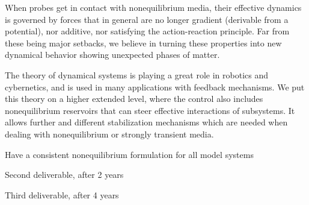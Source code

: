 \begin{workpackage}[id=WPcore,wphases=0-48,
  short=Gen. Theory, %
  title=General Theory, %
  lead=KUL,
  KULRM=36,UNIPDRM=6]
\begin{wpdescription}
\printbibliography[heading=proposal-bib,env=proposal-env]

\end{wpdescription}

\begin{tasklist}

\begin{task}[title=Theory of statistical forces outside equilibrium,id=core-t1,lead=KUL,partners={UNIPD},wphases={0-24!0.5,12-30}]
When probes get in contact with nonequilibrium media, their effective dynamics is governed
by forces that in general are no longer gradient (derivable from a potential), nor additive,
nor satisfying the action-reaction principle. Far from these being major setbacks, we
believe in turning these properties into new dynamical behavior showing unexpected phases of
matter.
\end{task}

\begin{task}[title=Stability and control theory,id=core-t2,PM=12,lead=KUL,wphases=12-36!0.5]
The theory of dynamical systems is playing a great role in robotics and cybernetics, and is
used in many applications with feedback mechanisms. We put this theory on a higher extended
level, where the control also includes nonequilibrium reservoirs that can steer effective
interactions of subsystems.
%
It allows further and different stabilization mechanisms which are needed when dealing with
nonequilibrium or strongly transient media.
\end{task}

\end{tasklist}

\begin{wpdelivs}
  \begin{wpdeliv}[due=24,id=core-d1,dissem=PU,nature=DEM,lead=KUL,miles=framework]
      {Have a consistent nonequilibrium formulation for all model systems}
  \end{wpdeliv}
  \begin{wpdeliv}[due=24,id=core-d2,dissem=PU,nature=DEM,lead=KUL]
      {Second deliverable, after 2 years}
\end{wpdeliv}
  \begin{wpdeliv}[due=48,id=core-d3,dissem=PU,nature=DEM,lead=KUL]
      {Third deliverable, after 4 years}
\end{wpdeliv}
\end{wpdelivs}

\end{workpackage}
